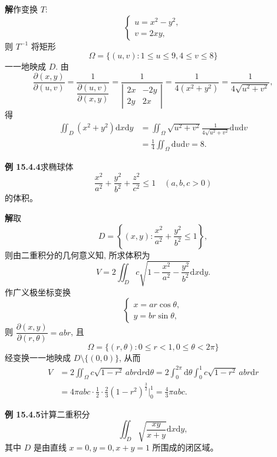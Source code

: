 \documentclass[UTF8, 12pt, fontset=fandol, oneside]{ctexart}
\begin{document}
\noindent\textbf{解}\quad 作变换 $T$:
\[
  \begin{cases}
    u=x^2-y^2,\\
    v=2xy,
  \end{cases}
\]
则 $T^{-1}$ 将矩形
\[
  \Omega=\{(u,v):1\leqslant u\leqslant9,4\leqslant v\leqslant8\}
  \]
一一地映成 $D$. 由
\[
  \frac{\partial(x,y)}{\partial(u,v)}
  =\frac1{\dfrac{\partial(u,v)}{\partial(x,y)}}
  =\frac1{\left|\begin{matrix}2x&-2y\\2y&2x\end{matrix}\right|}
  =\frac1{4(x^2+y^2)}
  =\frac1{4\sqrt{u^2+v^2}},
\]
得
\[
\begin{aligned}
  \iint_D(x^2+y^2)\mathrm dx\mathrm dy
  &=\iint_\Omega\sqrt{u^2+v^2}\frac1{4\sqrt{u^2+v^2}}\mathrm du\mathrm dv\\
  &=\frac14\iint_\Omega\mathrm du\mathrm dv=8.
\end{aligned}
\]

\noindent\textbf{例 15.4.4}\quad 求椭球体
\[
  \frac{x^2}{a^2}+\frac{y^2}{b^2}+\frac{z^2}{c^2}\leqslant1\quad(a,b,c>0)
\]
的体积。

\noindent\textbf{解}\quad 取
\[
  D=\left\{(x,y):\frac{x^2}{a^2}+\frac{y^2}{b^2}\leqslant1\right\},
\]
则由二重积分的几何意义知, 所求体积为
\[
  V=2\iint_D c\sqrt{1-\frac{x^2}{a^2}-\frac{y^2}{b^2}}\mathrm dx\mathrm dy.
\]
作广义极坐标变换
\[
  \begin{cases}
    x=ar\cos\theta,\\
    y=br\sin\theta,
  \end{cases}
\]
则 $\dfrac{\partial(x,y)}{\partial(r,\theta)}=abr$, 且
\[
  \Omega=\{(r,\theta):0\leqslant r<1,0\leqslant\theta<2\pi\}
\]
经变换一一地映成 $D\setminus\{(0,0)\}$, 从而
\[
\begin{aligned}
  V&=2\iint_\Omega c\sqrt{1-r^2}\,abr\mathrm dr\mathrm d\theta
  =2\int_0^{2\pi}\mathrm d\theta\int_0^1 c\sqrt{1-r^2}\,abr\mathrm dr\\
  &=4\pi abc\cdot\frac12\cdot\frac23(1-r^2)^{\frac32}\Big|_0^1
  =\frac43\pi abc.
\end{aligned}
\]

\noindent\textbf{例 15.4.5}\quad 计算二重积分
\[
  \iint_D\sqrt{\frac{xy}{x+y}}\mathrm dx\mathrm dy,
\]
其中 $D$ 是由直线 $x=0,y=0,x+y=1$ 所围成的闭区域。
\end{document}
